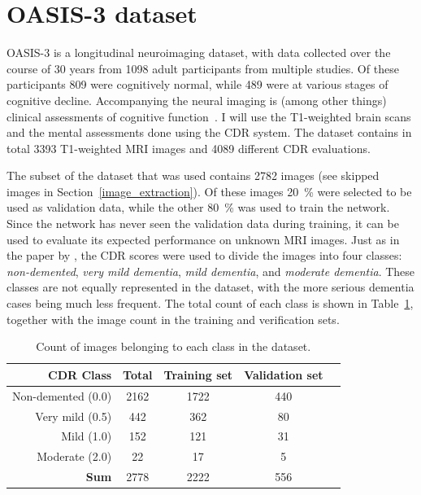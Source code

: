 \documentclass{kththesis}
\begin{document}
\section{OASIS-3 dataset} \label{dataset}
OASIS-3 is a longitudinal neuroimaging dataset, with data collected over the course of 30 years from 1098 adult participants from multiple studies. Of these participants 809 were cognitively normal, while 489 were at various stages of cognitive decline. Accompanying the neural imaging is (among other things) clinical assessments of cognitive function~\cite{oasis3}. I will use the T1-weighted brain scans and the mental assessments done using the CDR system. The dataset contains in total \num{3393} T1-weighted MRI images and \num{4089} different CDR evaluations.

The subset of the dataset that was used contains 2782 images (see skipped images in Section~\ref{image_extraction}). Of these images 20~\% were selected to be used as validation data, while the other 80~\% was used to train the network. Since the network has never seen the validation data during training, it can be used to evaluate its expected performance on unknown MRI images. Just as in the paper by \textcite{islam2018early}, the CDR scores were used to divide the images into four classes: \textit{non-demented}, \textit{very mild dementia}, \textit{mild dementia}, and \textit{moderate dementia}. These classes are not equally represented in the dataset, with the more serious dementia cases being much less frequent. The total count of each class is shown in Table~\ref{tab:dataset_contents}, together with the image count in the training and verification sets.

\begin{table}[h]
  \begin{center}
    \caption{Count of images belonging to each class in the dataset.\label{tab:dataset_contents}}
    \begin{tabular}{r|cccc}
      \textbf{CDR Class} & \textbf{Total} & \textbf{Training set} & \textbf{Validation set} \\
      \toprule
      Non-demented (0.0) & 2162 & 1722 & 440 \\
      Very mild (0.5) & 442 & 362 & 80 \\
      Mild (1.0) & 152 & 121 & 31 \\
      Moderate (2.0) & 22 & 17 & 5 \\
      \bottomrule
      \textbf{Sum} & 2778 & 2222 & 556 \\
    \end{tabular}
  \end{center}
\end{table}
\end{document}
